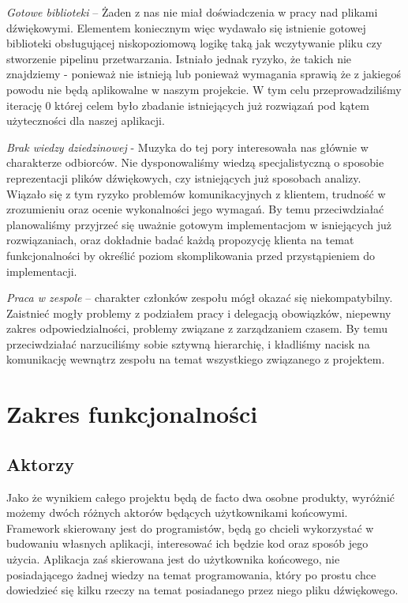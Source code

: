 \noindent\emph{Gotowe biblioteki} -- Żaden z nas nie miał doświadczenia w pracy nad plikami dźwiękowymi. Elementem koniecznym więc wydawało się istnienie gotowej biblioteki obsługującej niskopoziomową logikę taką jak wczytywanie pliku czy stworzenie pipelinu przetwarzania. Istniało jednak ryzyko, że takich nie znajdziemy - ponieważ nie istnieją lub ponieważ wymagania sprawią że z jakiegoś powodu nie będą aplikowalne w naszym projekcie. W tym celu przeprowadziliśmy iterację 0 której celem było zbadanie istniejących już rozwiązań pod kątem użyteczności dla naszej aplikacji.

\noindent\emph{Brak wiedzy dziedzinowej} - Muzyka do tej pory interesowała nas głównie w charakterze odbiorców. Nie dysponowaliśmy wiedzą specjalistyczną o sposobie reprezentacji plików dźwiękowych, czy istniejących już sposobach analizy. Wiązało się z tym ryzyko problemów komunikacyjnych z klientem, trudność w zrozumieniu oraz ocenie wykonalności jego wymagań. By temu przeciwdziałać planowaliśmy przyjrzeć się uważnie gotowym implementacjom w isniejących już rozwiązaniach, oraz dokładnie badać każdą propozycję klienta na temat funkcjonalności by określić poziom skomplikowania przed przystąpieniem do implementacji.

\noindent\emph{Praca w zespole} -- charakter członków zespołu mógł okazać się niekompatybilny. Zaistnieć mogły problemy z podziałem pracy i delegacją obowiązków, niepewny zakres odpowiedzialności, problemy związane z zarządzaniem czasem. By temu przeciwdziałać narzuciliśmy sobie sztywną hierarchię, i kładliśmy nacisk na komunikację wewnątrz zespołu na temat wszystkiego związanego z projektem.
 
\chapter{Zakres funkcjonalności}
\section{Aktorzy}
Jako że wynikiem całego projektu będą de facto dwa osobne produkty, wyróżnić możemy dwóch różnych aktorów będących użytkownikami końcowymi. Framework skierowany jest do programistów, będą go chcieli wykorzystać w budowaniu własnych aplikacji, interesować ich będzie kod oraz sposób jego użycia. Aplikacja zaś skierowana jest do użytkownika końcowego, nie posiadającego żadnej wiedzy na temat programowania, który po prostu chce dowiedzieć się kilku rzeczy na temat posiadanego przez niego pliku dźwiękowego.

